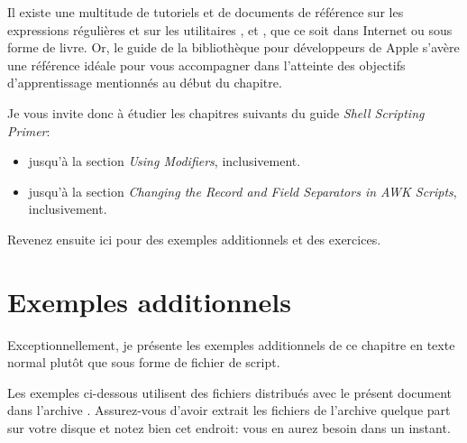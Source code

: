 Il existe une multitude de tutoriels et de documents de référence sur
les expressions régulières et sur les utilitaires ,
 et , que ce soit dans Internet ou sous forme de
livre. Or, le guide  de la bibliothèque
pour développeurs de Apple \citep{Apple:shellprimer} s'avère une
référence idéale pour vous accompagner dans l'atteinte des objectifs
d'apprentissage mentionnés au début du chapitre.


Je vous invite donc à étudier les chapitres suivants du guide
\emph{Shell Scripting Primer}:
\begin{itemize}
\item
   jusqu'à la section \emph{Using
    Modifiers}, inclusivement.
\item
   jusqu'à la section \emph{Changing the Record and
    Field Separators in AWK Scripts}, inclusivement.
\end{itemize}
Revenez ensuite ici pour des exemples additionnels et des exercices.



\section{Exemples additionnels}
\label{sec:texte:exemples}

Exceptionnellement, je présente les exemples additionnels de ce
chapitre en texte normal plutôt que sous forme de fichier de script.

Les exemples ci-dessous utilisent des fichiers distribués avec le
présent document dans l'archive .
Assurez-vous d'avoir extrait les fichiers de l'archive quelque part
sur votre disque et notez bien cet endroit: vous en aurez besoin dans
un instant.

